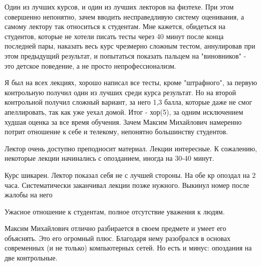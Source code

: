             \begin{commentbox} 
                Один из лучших курсов, и один из лучших лекторов на физтехе. При этом совершенно непонятно, зачем вводить несправедливую систему оценивания, а самому лектору так относиться к студентам. Мне кажется, обидеться на студентов, которые не хотели писать тесты через 40 минут после конца последней пары, наказать весь курс чрезмерно сложным тестом, аннулировав при этом предыдущий результат, и попытаться показать пальцем на "виновников" - это детское поведение, а не просто непрофессионализм. 

                Я был на всех лекциях, хорошо написал все тесты, кроме "штрафного", за первую контрольную получил один из лучших среди курса результат.  Но на второй контрольной получил сложный вариант, за него 1,3 балла, которые даже не смог апеллировать, так как уже уехал домой.  Итог - хор(5), за одним исключением худшая оценка за все время обучения. Зачем Максим Михайлович намеренно потрит отношение к себе и телекому, непонятно большинству студентов. 
            \end{commentbox} 
        
            \begin{commentbox} 
                Лектор очень доступно преподносит материал. Лекции интересные. К сожалению, некоторые лекции начинались с опозданием, иногда на 30-40 минут. 
            \end{commentbox} 
        
            \begin{commentbox} 
                Курс шикарен. Лектор показал себя не с лучшей стороны. На обе кр опоздал на 2 часа. Систематически заканчивал лекции позже нужного. Выкинул номер после жалобы на него 
            \end{commentbox} 
        
            \begin{commentbox} 
                Ужасное отношение к студентам, полное отсутствие уважения к людям. 
            \end{commentbox} 
        
            \begin{commentbox} 
                Максим Михайлович отлично разбирается в своем предмете и умеет его объяснять. Это его огромный плюс. Благодаря нему разобрался в основах современных (и не только) компьютерных сетей. Но есть и минус: опоздания на две контрольные. 
            \end{commentbox} 
        
